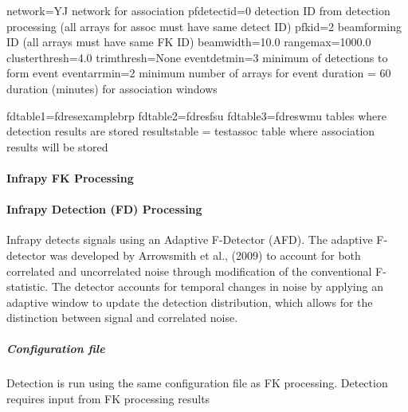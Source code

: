 \documentclass[letterpaper,10pt,english]{sphinxmanual}
\begin{document}
\begin{sphinxVerbatim}[commandchars=\\\{\}]
[AssocLocParams]
network=YJ
\PYGZsh{} network for association
pfdetectid=0
\PYGZsh{} detection ID from detection processing (all arrays for assoc must have same detect ID)
pfkid=2
\PYGZsh{} beamforming ID (all arrays must have same FK ID)
beamwidth=10.0
rangemax=1000.0
clusterthresh=4.0
trimthresh=None
eventdetmin=3
\PYGZsh{} minimum \PYGZsh{} of detections to form event
eventarrmin=2
\PYGZsh{} minimum number of arrays for event
duration = 60
\PYGZsh{} duration (minutes) for association windows

fdtable\PYGZus{}1=fd\PYGZus{}res\PYGZus{}example\PYGZus{}brp
\PYGZsh{}fdtable\PYGZus{}2=fd\PYGZus{}res\PYGZus{}fsu
\PYGZsh{}fdtable\PYGZus{}3=fd\PYGZus{}res\PYGZus{}wmu
\PYGZsh{} tables where detection results are stored
resultstable = test\PYGZus{}assoc
\PYGZsh{} table where association results will be stored
\end{sphinxVerbatim}


\paragraph{Infrapy FK Processing}
\label{\detokenize{fk:infrapy-fk-processing}}\label{\detokenize{fk:fk}}\label{\detokenize{fk::doc}}
\begin{sphinxVerbatim}[commandchars=\\\{\}]
    
\end{sphinxVerbatim}


\paragraph{Infrapy Detection (FD) Processing}
\label{\detokenize{fd:infrapy-detection-fd-processing}}\label{\detokenize{fd:fd}}\label{\detokenize{fd::doc}}
Infrapy detects signals using an Adaptive F-Detector (AFD). The adaptive F-detector was developed by Arrowsmith et al., (2009) to account for both correlated and uncorrelated noise through modification of the conventional F-statistic. The detector accounts for temporal changes in noise by applying an adaptive window to update the detection distribution, which allows for the distinction between signal and correlated noise.

\noindent{}


\subparagraph{Configuration file}
\label{\detokenize{fd:configuration-file}}
Detection is run using the same configuration file as FK processing.  Detection requires input from FK processing results
\end{document}
